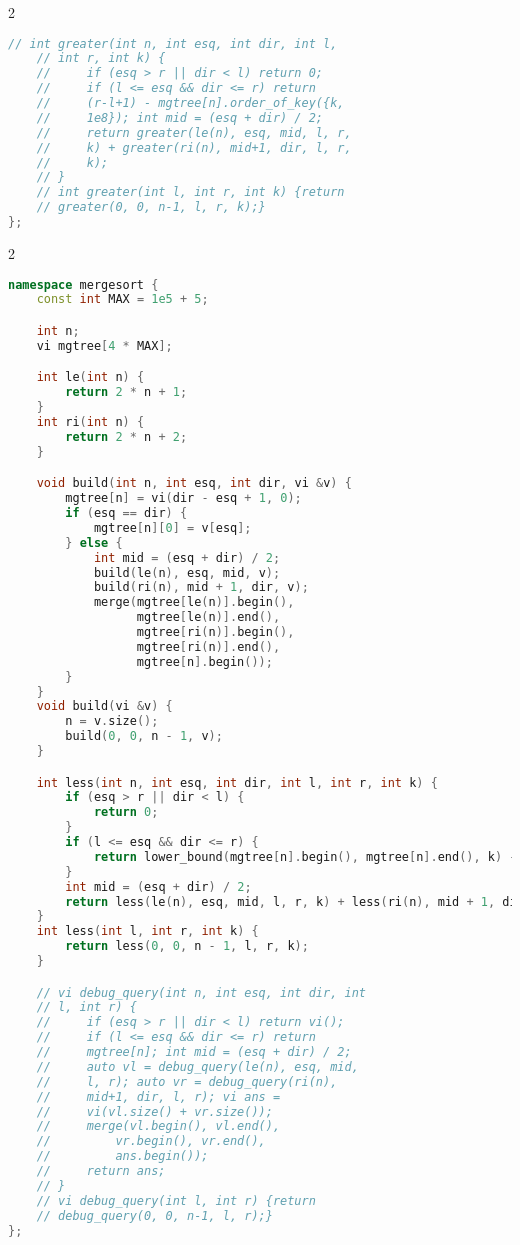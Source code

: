 \documentclass[11pt, a4paper, oneside]{book}
\begin{document}
\begin{multicols}{2}
\begin{lstlisting}[language=C++]
    // int greater(int n, int esq, int dir, int l,
    // int r, int k) {
    //     if (esq > r || dir < l) return 0;
    //     if (l <= esq && dir <= r) return
    //     (r-l+1) - mgtree[n].order_of_key({k,
    //     1e8}); int mid = (esq + dir) / 2;
    //     return greater(le(n), esq, mid, l, r,
    //     k) + greater(ri(n), mid+1, dir, l, r,
    //     k);
    // }
    // int greater(int l, int r, int k) {return
    // greater(0, 0, n-1, l, r, k);}
};
\end{lstlisting}
\end{multicols}

\hfill

\begin{multicols}{2}
\begin{lstlisting}[language=C++]
namespace mergesort {
    const int MAX = 1e5 + 5;

    int n;
    vi mgtree[4 * MAX];

    int le(int n) {
        return 2 * n + 1;
    }
    int ri(int n) {
        return 2 * n + 2;
    }

    void build(int n, int esq, int dir, vi &v) {
        mgtree[n] = vi(dir - esq + 1, 0);
        if (esq == dir) {
            mgtree[n][0] = v[esq];
        } else {
            int mid = (esq + dir) / 2;
            build(le(n), esq, mid, v);
            build(ri(n), mid + 1, dir, v);
            merge(mgtree[le(n)].begin(),
                  mgtree[le(n)].end(),
                  mgtree[ri(n)].begin(),
                  mgtree[ri(n)].end(),
                  mgtree[n].begin());
        }
    }
    void build(vi &v) {
        n = v.size();
        build(0, 0, n - 1, v);
    }

    int less(int n, int esq, int dir, int l, int r, int k) {
        if (esq > r || dir < l) {
            return 0;
        }
        if (l <= esq && dir <= r) {
            return lower_bound(mgtree[n].begin(), mgtree[n].end(), k) - mgtree[n].begin();
        }
        int mid = (esq + dir) / 2;
        return less(le(n), esq, mid, l, r, k) + less(ri(n), mid + 1, dir, l, r, k);
    }
    int less(int l, int r, int k) {
        return less(0, 0, n - 1, l, r, k);
    }

    // vi debug_query(int n, int esq, int dir, int
    // l, int r) {
    //     if (esq > r || dir < l) return vi();
    //     if (l <= esq && dir <= r) return
    //     mgtree[n]; int mid = (esq + dir) / 2;
    //     auto vl = debug_query(le(n), esq, mid,
    //     l, r); auto vr = debug_query(ri(n),
    //     mid+1, dir, l, r); vi ans =
    //     vi(vl.size() + vr.size());
    //     merge(vl.begin(), vl.end(),
    //         vr.begin(), vr.end(),
    //         ans.begin());
    //     return ans;
    // }
    // vi debug_query(int l, int r) {return
    // debug_query(0, 0, n-1, l, r);}
};
\end{lstlisting}
\end{multicols}
\end{document}
